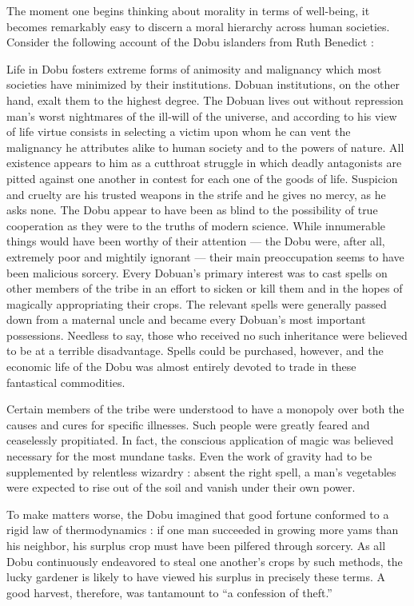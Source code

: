 \documentclass[a4paper,14pt]{extarticle}
\begin{document}
The moment one begins thinking about morality in terms of well-being, it becomes remarkably easy to discern a moral hierarchy across human societies.
Consider the following account of the Dobu islanders from Ruth Benedict :

Life in Dobu fosters extreme forms of animosity and malignancy which most societies have minimized by their institutions.
Dobuan institutions, on the other hand, exalt them to the highest degree.
The Dobuan lives out without repression man's worst nightmares of the ill-will of the universe, and according to his view of life virtue consists in selecting a victim upon whom he can vent the malignancy he attributes alike to human society and to the powers of nature.
All existence appears to him as a cutthroat struggle in which deadly antagonists are pitted against one another in contest for each one of the goods of life.
Suspicion and cruelty are his trusted weapons in the strife and he gives no mercy, as he asks none.
The Dobu appear to have been as blind to the possibility of true cooperation as they were to the truths of modern science.
While innumerable things would have been worthy of their attention --- the Dobu were, after all, extremely poor and mightily ignorant --- their main preoccupation seems to have been malicious sorcery.
Every Dobuan's primary interest was to cast spells on other members of the tribe in an effort to sicken or kill them and in the hopes of magically appropriating their crops.
The relevant spells were generally passed down from a maternal uncle and became every Dobuan's most important possessions.
Needless to say, those who received no such inheritance were believed to be at a terrible disadvantage.
Spells could be purchased, however, and the economic life of the Dobu was almost entirely devoted to trade in these fantastical commodities.

Certain members of the tribe were understood to have a monopoly over both the causes and cures for specific illnesses.
Such people were greatly feared and ceaselessly propitiated.
In fact, the conscious application of magic was believed necessary for the most mundane tasks.
Even the work of gravity had to be supplemented by relentless wizardry :
absent the right spell, a man's vegetables were expected to rise out of the soil and vanish under their own power.

To make matters worse, the Dobu imagined that good fortune conformed to a rigid law of thermodynamics :
if one man succeeded in growing more yams than his neighbor, his surplus crop must have been pilfered through sorcery.
As all Dobu continuously endeavored to steal one another's crops by such methods, the lucky gardener is likely to have viewed his surplus in precisely these terms.
A good harvest, therefore, was tantamount to ``a confession of theft.''
\end{document}
